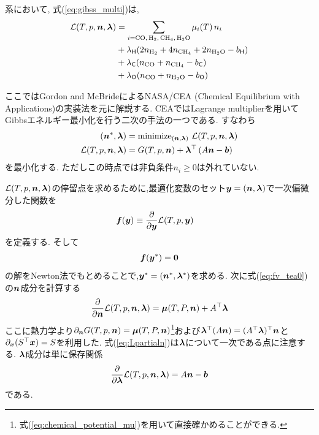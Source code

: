 系において, 式(\ref{eq:gibss_multi})は,
\begin{align}
    \mathcal{L}(T, p, \nv,\lambdav) &= \sum_{i = \ce{CO, H2, CH4, H2O}} \mu_i (T) \, n_i \nonumber \\ &+ \lambda_{\Hel} (2 n_{\ce{H2}} + 4 n_{\ce{CH4}} + 2 n_{\ce{H2O}} - b_\Hel) \nonumber \\
    &+ \lambda_{\Cel} (n_{\ce{CO}} + n_{\ce{CH4}} - b_\Cel) \nonumber \\ 
    &+  \lambda_{\Oel} ( n_{\ce{CO}} + n_{\ce{H2O}} - b_\Oel)
\end{align}

ここではGordon and McBrideによるNASA/CEA (Chemical Equilibrium with Applications)の実装法を元に解説する\cite{gordon1994computer,2024arXiv241207166G}. CEAではLagrange multiplierを用いてGibbsエネルギー最小化を行う二次の手法の一つである. すなわち
\begin{align}
    (\boldsymbol{n}^\ast, \boldsymbol{\lambda})  &= \mathrm{minimize}_{(\boldsymbol{n},\boldsymbol{\lambda})} \,\, \mathcal{L}(T, p, \boldsymbol{n}, \boldsymbol{\lambda}) \\
    \mathcal{L}(T, p, \boldsymbol{n},\boldsymbol{\lambda}) &= G(T, p, \boldsymbol{n}) + \boldsymbol{\lambda}^\top \left(A \boldsymbol{n} - \boldsymbol{b}\right)  
\end{align}
を最小化する. ただしこの時点では非負条件$n_i \ge 0$は外れていない. 

$\mathcal{L}(T, p, \boldsymbol{n}, \boldsymbol{\lambda})$の停留点を求めるために,最適化変数のセット$\boldsymbol{y} = (\boldsymbol{n}, \boldsymbol{\lambda})$で一次偏微分した関数を
\begin{align}
\label{eq:fv_tea0}
    \boldsymbol{f}(\boldsymbol{y}) &\equiv \frac{\partial  }{\partial \boldsymbol{y}} \mathcal{L}(T, p, \boldsymbol{y}) 
\end{align}
を定義する. そして
\begin{align}
    \label{eq:fv_tea}
    \boldsymbol{f}(\boldsymbol{y}^\ast) = \boldsymbol{0}
\end{align}
の解をNewton法でもとめることで,$\boldsymbol{y}^\ast = (\boldsymbol{n}^\ast, \boldsymbol{\lambda}^\ast)$を求める. 次に式(\ref{eq:fv_tea0})の$\boldsymbol{n}$成分を計算する
\begin{align}
\label{eq:Lpartialn}
    \frac{\partial}{\partial \boldsymbol{n}}   \mathcal{L}(T, p, \boldsymbol{n}, \boldsymbol{\lambda}) =  \boldsymbol{\mu} (T, P, \boldsymbol{n}) + A^\top \boldsymbol{\lambda}  
\end{align}
ここに熱力学より$\partial_{\boldsymbol{n}} G(T, p, \boldsymbol{n}) =  \boldsymbol{\mu} (T, P, \boldsymbol{n})$\footnote{式(\ref{eq:chemical_potential_mu})を用いて直接確かめることができる. }および$\boldsymbol{\lambda}^\top (A \boldsymbol{n}) = (A^\top \boldsymbol{\lambda})^\top \boldsymbol{n}$と$\partial_{\boldsymbol{x}} (S^\top \boldsymbol{x}) = S$を利用した. 
式(\ref{eq:Lpartialn})は$\boldsymbol{\lambda}$について一次である点に注意する. $\boldsymbol{\lambda}$成分は単に保存関係
\begin{align}
\label{eq:Lpartiall}
\frac{\partial}{\partial \boldsymbol{\lambda}}  \mathcal{L}(T, p, \boldsymbol{n}, \boldsymbol{\lambda}) = A \boldsymbol{n} - \boldsymbol{b}  
\end{align}
である. 

